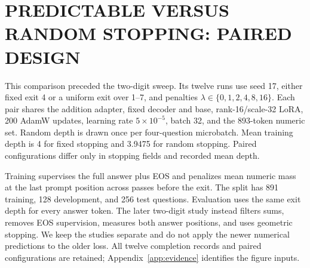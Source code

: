\section{PREDICTABLE VERSUS RANDOM STOPPING: PAIRED DESIGN}\label{app:predictable}
This comparison preceded the two-digit sweep. Its twelve runs use seed 17, either fixed exit 4 or a uniform exit over 1--7, and penalties $\lambda\in\{0,1,2,4,8,16\}$. Each pair shares the addition adapter, fixed decoder and base, rank-16/scale-32 LoRA, 200 AdamW updates, learning rate $5\times10^{-5}$, batch 32, and the 893-token numeric set. Random depth is drawn once per four-question microbatch. Mean training depth is 4 for fixed stopping and 3.9475 for random stopping. Paired configurations differ only in stopping fields and recorded mean depth.

Training supervises the full answer plus EOS and penalizes mean numeric mass at the last prompt position across passes before the exit. The split has 891 training, 128 development, and 256 test questions. Evaluation uses the same exit depth for every answer token. The later two-digit study instead filters sums, removes EOS supervision, measures both answer positions, and uses geometric stopping. We keep the studies separate and do not apply the newer numerical predictions to the older loss. All twelve completion records and paired configurations are retained; Appendix~\ref{app:evidence} identifies the figure inputs.

